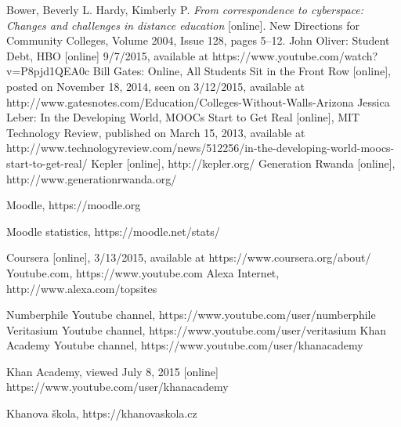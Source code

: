 
\def\bibname{Bibliography}
\begin{thebibliography}{99}
\addcontentsline{toc}{chapter}{\bibname}


{\sc Bower,} Beverly L. {\sc Hardy,} Kimberly P.
\emph{From correspondence to cyberspace: Changes and challenges in distance education} [online].
New Directions for Community Colleges, Volume 2004, Issue 128, pages 5–12.
John Oliver: Student Debt, HBO [online] 9/7/2015, available at https://www.youtube.com/watch?v=P8pjd1QEA0c
Bill Gates: Online, All Students Sit in the Front Row [online], posted on November 18, 2014, seen on 3/12/2015, available at http://www.gatesnotes.com/Education/Colleges-Without-Walls-Arizona
Jessica Leber: In the Developing World, MOOCs Start to Get Real [online], MIT Technology Review, published on March 15, 2013, available at http://www.technologyreview.com/news/512256/in-the-developing-world-moocs-start-to-get-real/
Kepler [online], http://kepler.org/
Generation Rwanda [online], http://www.generationrwanda.org/

Moodle, https://moodle.org

Moodle statistics, https://moodle.net/stats/

Coursera [online], 3/13/2015, available at https://www.coursera.org/about/
Youtube.com, https://www.youtube.com
Alexa Internet, http://www.alexa.com/topsites

Numberphile Youtube channel, https://www.youtube.com/user/numberphile
Veritasium Youtube channel, https://www.youtube.com/user/veritasium
Khan Academy Youtube channel, https://www.youtube.com/user/khanacademy

Khan Academy, viewed July 8, 2015 [online]
https://www.youtube.com/user/khanacademy

Khanova škola, https://khanovaskola.cz



\end{thebibliography}
